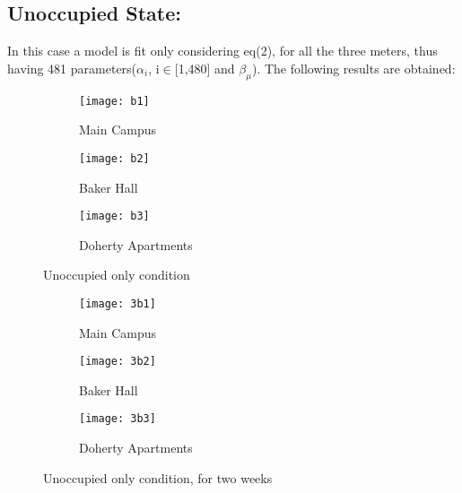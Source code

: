 \documentclass[a4paper,11pt]{article}
\begin{document}
\begin{itemize}
\subsection{Unoccupied State:}
In this case a model is fit only considering eq(2), for all the three meters, thus having 481 parameters($\alpha_i$, i$\in$[1,480] and $\beta_{\mu}$). The following results are obtained:
\begin{figure}[H]
        \centering
        \begin{subfigure}[b]{0.3\textwidth}
                \texttt{[image: b1]}
                \caption{Main Campus}
                \label{fig:Load 1}
        \end{subfigure}%
\hfill
        \begin{subfigure}[b]{0.3\textwidth}
                \texttt{[image: b2]}
                \caption{Baker Hall}
                \label{fig:tiger}
        \end{subfigure}
 \hfill       
        \begin{subfigure}[b]{0.35\textwidth}
                \texttt{[image: b3]}
                \caption{Doherty Apartments}
                \label{fig:tiger}
        \end{subfigure}
        \caption{Unoccupied only condition}\label{fig:animals}
\end{figure}

\begin{figure}[H]
        \centering
        \begin{subfigure}[b]{0.3\textwidth}
                \texttt{[image: 3b1]}
                \caption{Main Campus}
                \label{fig:Load 1}
        \end{subfigure}%
\hfill
        \begin{subfigure}[b]{0.3\textwidth}
                \texttt{[image: 3b2]}
                \caption{Baker Hall}
                \label{fig:tiger}
        \end{subfigure}
 \hfill       
        \begin{subfigure}[b]{0.35\textwidth}
                \texttt{[image: 3b3]}
                \caption{Doherty Apartments}
                \label{fig:tiger}
        \end{subfigure}
        \caption{Unoccupied only condition, for two weeks}\label{fig:animals}
\end{figure}


\end{itemize}
\end{document}
